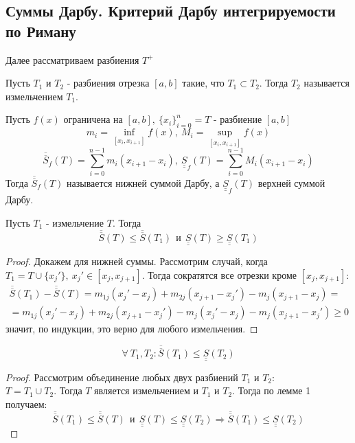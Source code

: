 \subsection{Суммы Дарбу. Критерий Дарбу интегрируемости по Риману}
Далее рассматриваем разбиения $T^+$
\begin{definition}
    Пусть $T_{1}$ и $T_{2}$ - разбиения отрезка $[a,b]$ такие, что $T_1\subset T_2$. Тогда $T_2$ называется измельчением $T_1$.
\end{definition} 
\begin{definition}
    Пусть $f(x)$ ограничена на $[a,b],\ \{x_i\}_{i=0}^n=T$ - разбиение $[a,b]$
    \[m_i=\inf\limits_{[x_i, x_{i+1}]} f(x),\ M_i=\sup\limits_{[x_i, x_{i+1}]}f(x)\] 
    \[\overline{\overline{S}}_f(T)=\sum\limits_{i=0}^{n-1}m_i(x_{i+1}-x_i),\ \underline{\underline{S}}_f(T)=\sum\limits_{i=0}^{n-1}M_i(x_{i+1}-x_i)\]
    Тогда $\overline{\overline{S}}_f(T)$ называется нижней суммой Дарбу, а $\underline{\underline{S}}_f(T)$ верхней суммой Дарбу.
\end{definition} 
\begin{numlemma}
    Пусть $T_1$ - измельчение $T$. Тогда
    \[\overline{\overline{S}}(T)\leq \overline{\overline{S}}(T_1)\ \ \text{и}\ \ \underline{\underline{S}}(T)\geq \underline{\underline{S}}(T_1)\]
\end{numlemma} 
\begin{proof}
    Докажем для нижней суммы. Рассмотрим случай, когда\\
    $T_1=T\cup \{x_j'\},\ x_j'\in [x_j, x_{j+1}]$. Тогда сократятся все отрезки кроме $[x_j,x_{j+1}]:$
    \begin{multline*}
        \overline{\overline{S}}(T_1)-\overline{\overline{S}}(T)=m_{1j}(x_j'-x_j)+m_{2j}(x_{j+1}-x_j')-m_j(x_{j+1}-x_j)=\\
        =m_{1j}(x_j'-x_j)+m_{2j}(x_{j+1}-x_j')-m_j(x_j'-x_j)-m_j(x_{j+1}-x_j')\geq 0
    \end{multline*}
    значит, по индукции, это верно для любого измельчения.
\end{proof} 
\begin{numlemma}
    \[\forall\ T_1, T_2: \overline{\overline{S}}(T_1)\leq \underline{\underline{S}}(T_2)\]
\end{numlemma} 
\begin{proof}
    Рассмотрим объединение любых двух разбиений $T_1$ и $T_2$:\\ $T=T_1\cup T_2$. Тогда $T$ является измельчением и $T_1$ и $T_2$. Тогда по лемме 1 получаем:
    \[\overline{\overline{S}}(T_1)\leq \overline{\overline{S}}(T)\ \ \text{и}\ \ \underline{\underline{S}}(T)\leq \underline{\underline{S}}(T_2) \Rightarrow \overline{\overline{S}}(T_1)\leq \underline{\underline{S}}(T_2)\]
\end{proof} 
